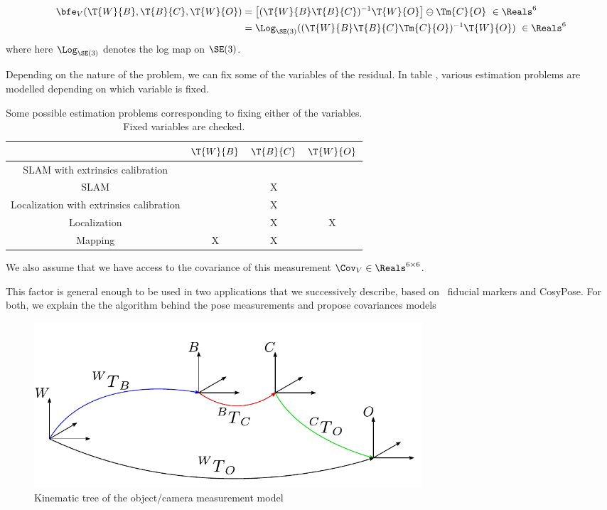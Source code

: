 \begin{align}
    \bfe_V (\T{W}{B}, \T{B}{C}, \T{W}{O}) 
    &= \left[ (\T{W}{B}\T{B}{C})^{-1}\T{W}{O} \right] \ominus \Tm{C}{O} ~ \in \Reals^6 \\
    &= \Log_{\SE(3)} ( (\T{W}{B} \T{B}{C} \Tm{C}{O})^{-1} \T{W}{O}) ~ \in \Reals^6
\end{align}
%
where here $\Log_{\SE(3)}$ denotes the log map on $\SE(3)$.

Depending on the nature of the problem, we can fix some of the variables of the residual. In table , various estimation problems are modelled depending on which variable is fixed.

\begin{table}[h]
    \centering
    \begin{tabular}{|c|c|c|c|}
        \hline
        & $\T{W}{B}$ & $\T{B}{C}$ & $\T{W}{O}$  \\
        \hline
        SLAM with extrinsics calibration & & & \\
        \hline
        SLAM & & X & \\
        \hline
        Localization with extrinsics calibration & & X & \\
        \hline
        Localization &  & X & X \\
        \hline
        Mapping & X & X &  \\
        \hline
    \end{tabular}
    \caption{Some possible estimation problems corresponding to fixing either of the variables. Fixed variables are checked.}
    \label{tab:res_var_fix}
\end{table}



We also assume that we have access to the covariance of this measurement 
\mbox{$\Cov_V \in \Reals^{6 \times 6}$}. 

This factor is general enough to be used in two applications that we successively describe, based on \apriltag\ fiducial markers and CosyPose. For both, we explain the
the algorithm behind the pose measurements and propose covariances models


\begin{figure}
    \centering
    \includegraphics[width=0.7\textwidth]{figures/kin_tree_object.pdf}
    \caption{Kinematic tree of the object/camera measurement model}
    \label{fig:camera_object_chain}
\end{figure}

